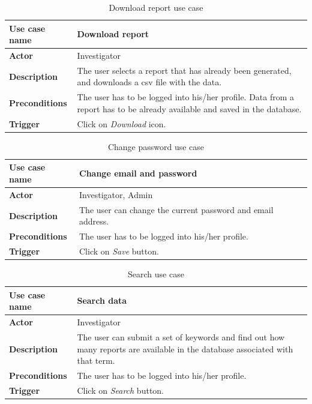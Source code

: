 \begin{table}[!h]
\centering
\begin{tabular}{l p{9cm}}  
\toprule
\bf{Use case name}    & Download report \\
\midrule
\bf{Actor}    & Investigator \\
\midrule
\bf{Description}    & The user selects a report that has already been
generated, and downloads a csv file with the data.
\\
\midrule
\bf{Preconditions}    & The user has to be logged into his/her profile. Data
from a report has to be already available and saved in the database.
\\
\midrule
\bf{Trigger}    & Click on \emph{Download} icon. \\
\bottomrule
\end{tabular}
\caption{Download report use case}
\end{table}

\begin{table}[!h]
\centering
\begin{tabular}{l p{9cm}}  
\toprule
\bf{Use case name}    & Change email and password \\
\midrule
\bf{Actor}    & Investigator, Admin \\
\midrule
\bf{Description}    & The user can change the current password and email
address.
\\
\midrule
\bf{Preconditions}    & The user has to be logged into his/her profile.
\\
\midrule
\bf{Trigger}    & Click on \emph{Save} button. \\
\bottomrule
\end{tabular}
\caption{Change password use case}
\end{table}

\begin{table}[!h]
\centering
\begin{tabular}{l p{9cm}}  
\toprule
\bf{Use case name}    & Search data \\
\midrule
\bf{Actor}    & Investigator \\
\midrule
\bf{Description}    & The user can submit a set of keywords and find out how
many reports are available in the database associated with that term.
\\
\midrule
\bf{Preconditions}    & The user has to be logged into his/her profile.
\\
\midrule
\bf{Trigger}    & Click on \emph{Search} button. \\
\bottomrule
\end{tabular}
\caption{Search use case}
\end{table}

